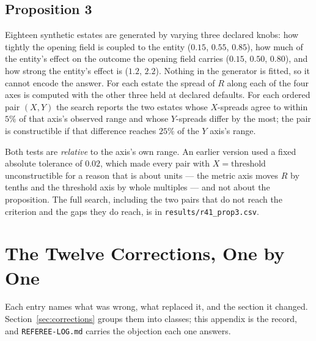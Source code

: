 \documentclass[preprint,12pt]{elsarticle}
\begin{document}
\subsection*{Proposition 3}

Eighteen synthetic estates are generated by varying three declared knobs: how
tightly the opening field is coupled to the entity ($0.15$, $0.55$, $0.85$),
how much of the entity's effect on the outcome the opening field carries
($0.15$, $0.50$, $0.80$), and how strong the entity's effect is ($1.2$,
$2.2$). Nothing in the generator is fitted, so it cannot encode the answer.
For each estate the spread of $R$ along each of the four axes is computed with
the other three held at declared defaults. For each ordered pair $(X,Y)$ the
search reports the two estates whose $X$-spreads agree to within $5\%$ of that
axis's observed range and whose $Y$-spreads differ by the most; the pair is
constructible if that difference reaches $25\%$ of the $Y$ axis's range.

Both tests are \emph{relative} to the axis's own range. An earlier version
used a fixed absolute tolerance of $0.02$, which made every pair with
$X = \text{threshold}$ unconstructible for a reason that is about units --- the
metric axis moves $R$ by tenths and the threshold axis by whole multiples ---
and not about the proposition. The full search, including the two pairs that
do not reach the criterion and the gaps they do reach, is in
\texttt{results/r41\_prop3.csv}.

\section{The Twelve Corrections, One by One}
\label{app:incidents}

Each entry names what was wrong, what replaced it, and the section it
changed.  Section~\ref{sec:corrections} groups them into classes; this
appendix is the record, and \texttt{REFEREE-LOG.md} carries the
objection each one answers.
\end{document}
